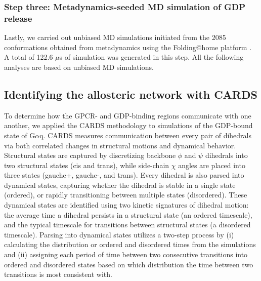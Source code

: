 \documentclass[../main.tex]{subfiles}
\begin{document}
        \subsubsection{Step three: Metadynamics-seeded MD simulation of GDP release}
            Lastly, we carried out unbiased MD simulations initiated from the 2085 conformations obtained from metadynamics using the Folding@home platform \cite{Shirts:2000du}. A total of 122.6 $\mu$s of simulation was generated in this step. All the following analyses are based on unbiased MD simulations.

    \subsection{Identifying the allosteric network with CARDS}
        To determine how the GPCR- and GDP-binding regions communicate with one another, we applied the CARDS\cite{Singh:2017hh} methodology to simulations of the GDP-bound state of G$\alpha$q. CARDS measures communication between every pair of dihedrals via both correlated changes in structural motions and dynamical behavior. Structural states are captured by discretizing backbone $\phi$ and $\psi$ dihedrals into two structural states (cis and trans), while side-chain $\chi$ angles are placed into three states (gauche+, gauche-, and trans). Every dihedral is also parsed into dynamical states, capturing whether the dihedral is stable in a single state (ordered), or rapidly transitioning between multiple states (disordered). These dynamical states are identified using two kinetic signatures of dihedral motion: the average time a dihedral persists in a structural state (an ordered timescale), and the typical timescale for transitions between structural states (a disordered timescale). Parsing into dynamical states utilizes a two-step process by (i) calculating the distribution or ordered and disordered times from the simulations and (ii) assigning each period of time between two consecutive transitions into ordered and disordered states based on which distribution the time between two transitions is most consistent with.
\end{document}

